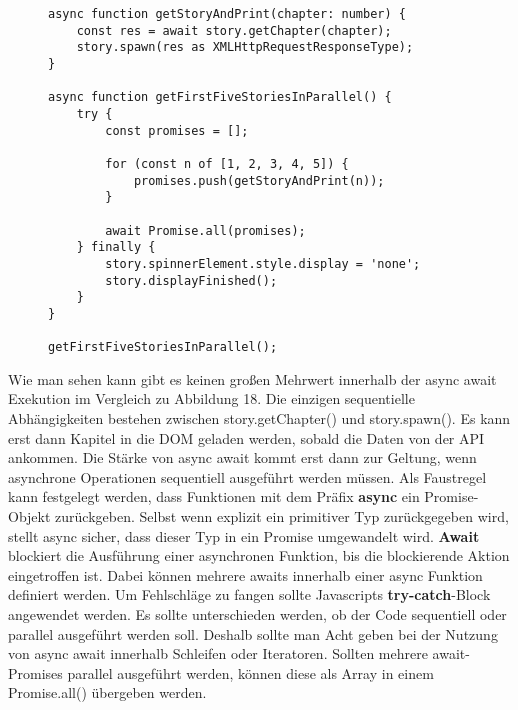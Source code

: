 \begin{figure}[H]
\begin{lstlisting}
async function getStoryAndPrint(chapter: number) {
    const res = await story.getChapter(chapter);
    story.spawn(res as XMLHttpRequestResponseType);
}

async function getFirstFiveStoriesInParallel() {
    try {
        const promises = [];

        for (const n of [1, 2, 3, 4, 5]) {
            promises.push(getStoryAndPrint(n));
        }

        await Promise.all(promises);
    } finally {
        story.spinnerElement.style.display = 'none';
        story.displayFinished();
    }
}

getFirstFiveStoriesInParallel();
\end{lstlisting}
\end{figure}

\noindent
Wie man sehen kann gibt es keinen großen Mehrwert innerhalb der async await Exekution im Vergleich zu Abbildung 18. Die einzigen sequentielle Abhängigkeiten bestehen zwischen story.getChapter() und story.spawn(). Es kann erst dann Kapitel in die DOM geladen werden, sobald die Daten von der API ankommen. Die Stärke von async await kommt erst dann zur Geltung, wenn asynchrone Operationen sequentiell ausgeführt werden müssen. Als Faustregel kann festgelegt werden, dass Funktionen mit dem Präfix \textbf{async} ein Promise-Objekt zurückgeben. Selbst wenn explizit ein primitiver Typ zurückgegeben wird, stellt async sicher, dass dieser Typ in ein Promise umgewandelt wird. \textbf{Await} blockiert die Ausführung einer asynchronen Funktion, bis die blockierende Aktion eingetroffen ist. Dabei können mehrere awaits innerhalb einer async Funktion definiert werden. Um Fehlschläge zu fangen sollte Javascripts \textbf{try-catch}-Block angewendet werden. Es sollte unterschieden werden, ob der Code sequentiell oder parallel ausgeführt werden soll. Deshalb sollte man Acht geben bei der Nutzung von async await innerhalb Schleifen oder Iteratoren. Sollten mehrere await-Promises parallel ausgeführt werden, können diese als Array in einem Promise.all() übergeben werden.


